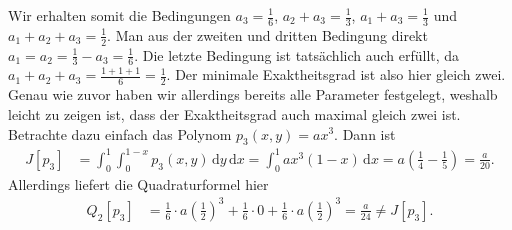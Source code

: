 \documentclass[english, parskip=full]{scrartcl}
\newcommand{\intx}{}
\newcommand{\kla}{}
\begin{document}
Wir erhalten somit die Bedingungen $a_3=\frac{1}{6}$, $a_2+a_3 = \frac{1}{3}$, $a_1+a_3=\frac{1}{3}$ und $a_1+a_2+a_3 = \frac{1}{2}$.
Man aus der zweiten und dritten Bedingung direkt $a_1=a_2=\frac{1}{3}-a_3=\frac{1}{6}$.
Die letzte Bedingung ist tatsächlich auch erfüllt, da $a_1+a_2+a_3=\frac{1+1+1}{6}=\frac{1}{2}$.
Der minimale Exaktheitsgrad ist also hier gleich zwei.
Genau wie zuvor haben wir allerdings bereits alle Parameter festgelegt, weshalb leicht zu zeigen ist, dass der Exaktheitsgrad auch maximal gleich zwei ist.
Betrachte dazu einfach das Polynom $p_3(x,y)=ax^3$.
Dann ist
\begin{align}
J[p_3] &= \intx\int_{0}^{1}\intx\int_{0}^{1-x}p_3(x,y)\, \mathrm{d}y\, \mathrm{d}x = \intx\int_{0}^{1}ax^3(1-x)\, \mathrm{d}x = a\kla\left( \frac{1}{4}-\frac{1}{5} \right)=\frac{a}{20}.
\end{align}
Allerdings liefert die Quadraturformel hier
\begin{align}
Q_2[p_3] &= \frac{1}{6}\cdot a\kla\left( \frac{1}{2} \right)^3 + \frac{1}{6}\cdot 0 + \frac{1}{6}\cdot a\kla\left( \frac{1}{2} \right)^3 = \frac{a}{24}\neq J[p_3].
\end{align}


\newpage
\end{document}
